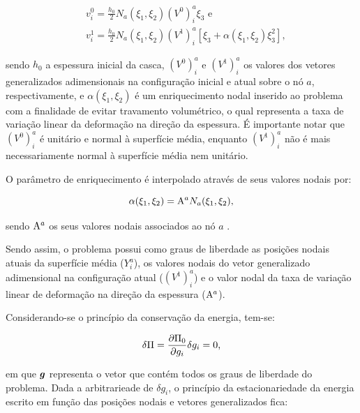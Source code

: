 \begin{subequations}
    \begin{align}
         & v_i^0=\frac{h_0}{2}N_ a(\xi_1,\xi_2)(V^0)_i^a\xi_3\text{ e}                             \\
         & v_i^1=\frac{h_0}{2}N_ a(\xi_1,\xi_2)(V^1)_i^a[\xi_3+\alpha(\xi_1,\xi_2)\xi_3^2]\text{,}
    \end{align}
\end{subequations}

\noindent sendo $h_0$ a espessura inicial da casca, $(V^0)_i^a$ e $(V^1)_i^a$ os valores dos vetores generalizados adimensionais na configuração inicial e atual sobre o nó $a$, respectivamente, e $\alpha(\xi_1,\xi_2)$ é um enriquecimento nodal inserido ao problema com a finalidade de evitar travamento volumétrico, o qual representa a taxa de variação linear da deformação na direção da espessura. É importante notar que $(V^0)_i^a$ é unitário e normal à superfície média, enquanto $(V^1)_i^a$ não é mais necessariamente normal à superfície média nem unitário.

O parâmetro de enriquecimento é interpolado através de seus valores nodais por:

\begin{equation}
    \alpha(\xi_1,\xi_2)=\mathrm{A}^aN_a(\xi_1,\xi_2)\text{,}
\end{equation}

\noindent sendo $\mathrm{A}^a$ os seus valores nodais associados ao nó $a$ \cite{sanches2013unconstrained,sanches2014fluid}.

Sendo assim, o problema possui como graus de liberdade as posições nodais atuais da superfície média ($Y_i^a$), os valores nodais do vetor generalizado adimensional na configuração atual ($(V^1)_i^a$) e o valor nodal da taxa de variação linear de deformação na direção da espessura ($\mathrm{A}^a$).


Considerando-se o princípio da conservação da energia, tem-se:

\begin{equation}
    \delta\Pi=\frac{\partial{\Pi_0}}{\partial{g_i}}\delta g_i=0\text{,}
\end{equation}

\noindent em que $\boldsymbol{g}$ representa o vetor que contém todos os graus de liberdade do problema. Dada a arbitrarieade de $\delta g_i$, o princípio da estacionariedade da energia escrito em função das posições nodais e vetores generalizados fica:

